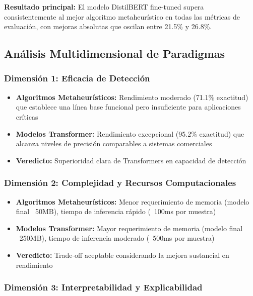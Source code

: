 \textbf{Resultado principal:} El modelo DistilBERT fine-tuned supera consistentemente al mejor algoritmo metaheurístico en todas las métricas de evaluación, con mejoras absolutas que oscilan entre 21.5\% y 26.8\%.

\subsection{Análisis Multidimensional de Paradigmas}

\subsubsection{Dimensión 1: Eficacia de Detección}

\begin{itemize}
    \item \textbf{Algoritmos Metaheurísticos:} Rendimiento moderado (71.1\% exactitud) que establece una línea base funcional pero insuficiente para aplicaciones críticas
    \item \textbf{Modelos Transformer:} Rendimiento excepcional (95.2\% exactitud) que alcanza niveles de precisión comparables a sistemas comerciales
    \item \textbf{Veredicto:} Superioridad clara de Transformers en capacidad de detección
\end{itemize}

\subsubsection{Dimensión 2: Complejidad y Recursos Computacionales}

\begin{itemize}
    \item \textbf{Algoritmos Metaheurísticos:} Menor requerimiento de memoria (modelo final ~50MB), tiempo de inferencia rápido (~100ms por muestra)
    \item \textbf{Modelos Transformer:} Mayor requerimiento de memoria (modelo final ~250MB), tiempo de inferencia moderado (~500ms por muestra)
    \item \textbf{Veredicto:} Trade-off aceptable considerando la mejora sustancial en rendimiento
\end{itemize}

\subsubsection{Dimensión 3: Interpretabilidad y Explicabilidad}

